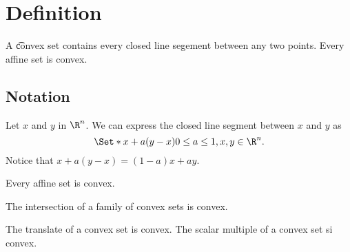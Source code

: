 
\section*{Definition}

A \t{convex set} contains every closed line segement between any two points.
Every affine set is convex.

\subsection*{Notation}

Let $x$ and $y$ in $\R ^n$. We can express the closed line segment between $x$ and $y$ as
  \[
\Set*{x + a(y - x)}{0 \leq a \leq 1, x, y \in \R ^n}.
  \]
Notice that $x + a(y - x) = (1-a)x + ay$.

\begin{proposition}
Every affine set is convex.
\end{proposition}

\begin{proposition}
The intersection of a family of convex sets is convex.
\end{proposition}

\begin{proposition}
The translate of a convex set is convex.
The scalar multiple of a convex set si convex.
\end{proposition}

\blankpage
